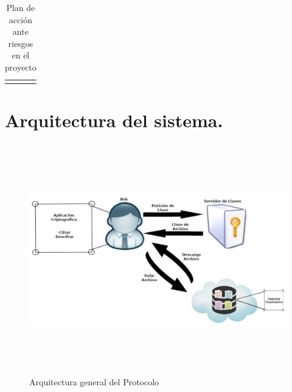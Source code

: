\begin{longtable}{| p{1cm} | p{5cm} | p{9.5cm} |}
\\ \hline
\caption{Plan de acción ante riesgos en el proyecto}
\label{Análisis de riesgos }
\end{longtable}



\section{Arquitectura del sistema. }

\begin{figure}[H]
\centering
\includegraphics[width=17cm, height=10cm]{./images/Arqui.jpg}
\caption{Arquitectura general del Protocolo}

\end{figure}

